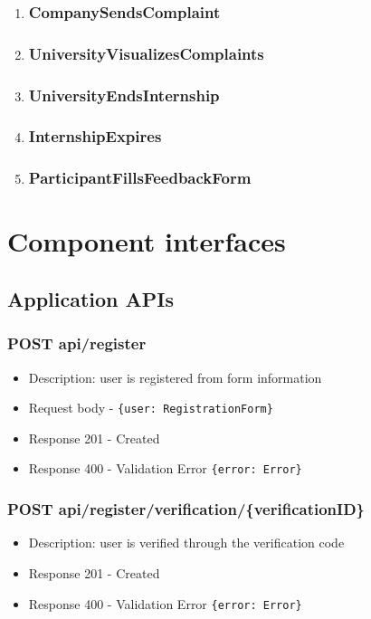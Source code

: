 \begin{enumerate}[label=\textbf{RV\arabic* -}]
\item \subsubsection{CompanySendsComplaint}
\item \subsubsection{UniversityVisualizesComplaints}
\item \subsubsection{UniversityEndsInternship}
\item \subsubsection{InternshipExpires}
\item \subsubsection{ParticipantFillsFeedbackForm}

\end{enumerate}

\section{Component interfaces}

\subsection{Application APIs}

\subsubsection{POST api/register}
\begin{itemize}
    \item Description: user is registered from form information
    \item Request body - \verb|{user: RegistrationForm}|
    \item Response 201 - Created
    \item Response 400 - Validation Error \verb|{error: Error}|
\end{itemize}

\subsubsection{POST api/register/verification/\{verificationID\}}
\begin{itemize}
    \item Description: user is verified through the verification code
    \item Response 201 - Created
    \item Response 400 - Validation Error \verb|{error: Error}|
\end{itemize}

